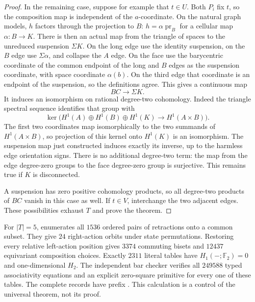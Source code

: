 \begin{proof}
In the remaining case, suppose for example that $t\in U$.
Both $P_i$ fix $t$, so the composition map is independent of
the $a$-coordinate.  On the natural graph models,
$h$ factors through the projection to $B$:
$h=\alpha\operatorname{pr}_B$ for a cellular map
$\alpha:B\to K$.  There is then an actual map from the
triangle of spaces to the unreduced suspension $\Sigma K$.
On the long edge use the identity suspension, on the $B$ edge
use $\Sigma\alpha$, and collapse the $A$ edge.  On the face
use the barycentric coordinate of the common endpoint of the
long and $B$ edges as the suspension coordinate, with space
coordinate $\alpha(b)$.  On the third edge that coordinate
is an endpoint of the suspension, so the definitions agree.
This gives a continuous map
\[
 BC\longrightarrow\Sigma K.
\]
It induces an isomorphism on rational degree-two cohomology.
Indeed the triangle spectral sequence identifies that group
with
\[
 \ker\bigl(H^1(A)\oplus H^1(B)\oplus H^1(K)
        \longrightarrow H^1(A\times B)\bigr).
\]
The first two coordinates map isomorphically to the two
summands of $H^1(A\times B)$, so projection of this kernel
onto $H^1(K)$ is an isomorphism.  The suspension map just
constructed induces exactly its inverse, up to the harmless
edge orientation signs.  There is no additional degree-two
term: the map from the edge degree-zero groups to the face
degree-zero group is surjective.  This remains true if $K$
is disconnected.

A suspension has zero positive cohomology products, so all
degree-two products of $BC$ vanish in this case as well.
If $t\in V$, interchange the two adjacent edges.  These
possibilities exhaust $T$ and prove the theorem.
\end{proof}

\begin{remark}
\label{C:affine-chart16-control}
For $|T|=5$,  enumerates all
$1536$ ordered pairs of retractions onto a common subset.
They give $24$ right-action orbits under state permutations.
Restoring every relative left-action position gives $3374$
commuting bisets and $12437$ equivariant composition choices.
Exactly $2311$ literal tables have $H_1(-;\mathbb F_2)=0$
and one-dimensional $H_2$.  The independent bar checker
verifies all $249588$ typed associativity equations and an
explicit zero-square primitive for every one of these tables.
The complete records have prefix
.
This calculation is a control of the universal theorem, not
its proof.
\end{remark}
